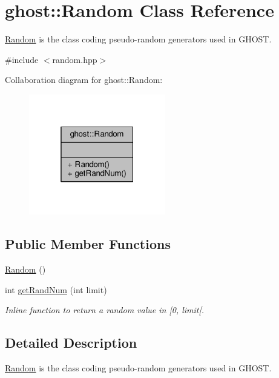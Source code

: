 \hypertarget{classghost_1_1Random}{}\section{ghost\+:\+:Random Class Reference}
\label{classghost_1_1Random}


\hyperlink{classghost_1_1Random}{Random} is the class coding pseudo-\/random generators used in G\+H\+O\+ST.  




{\ttfamily \#include $<$random.\+hpp$>$}



Collaboration diagram for ghost\+:\+:Random\+:
\nopagebreak
\begin{figure}[H]
\begin{center}
\leavevmode
\includegraphics[width=169pt]{classghost_1_1Random__coll__graph}
\end{center}
\end{figure}
\subsection*{Public Member Functions}
\begin{DoxyCompactItemize}
\item 
\hyperlink{classghost_1_1Random_a7c45efd1f7c522a68760104ba6084d89}{Random} ()
\item 
int \hyperlink{classghost_1_1Random_a26f7e445a05839bd89ca9c14f8b34fbc}{get\+Rand\+Num} (int limit)
\begin{DoxyCompactList}\small\item\em Inline function to return a random value in \mbox{[}0, limit\mbox{[}. \end{DoxyCompactList}\end{DoxyCompactItemize}


\subsection{Detailed Description}
\hyperlink{classghost_1_1Random}{Random} is the class coding pseudo-\/random generators used in G\+H\+O\+ST. 

